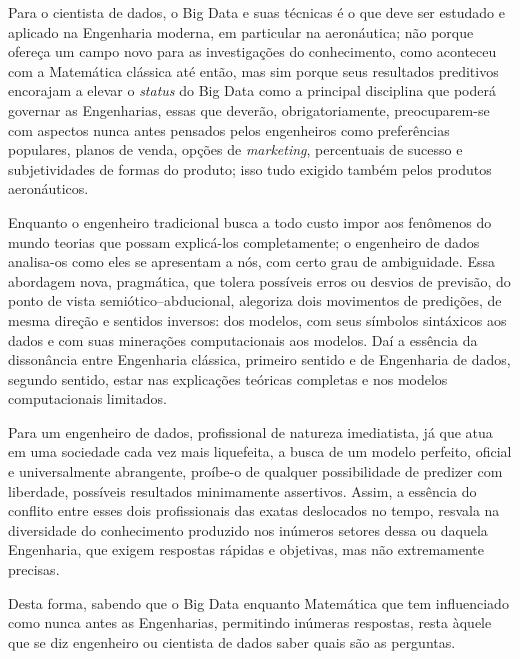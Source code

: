 \documentclass[12pt]{article} %
\begin{document}
			Para o cientista de dados, o Big Data e suas técnicas é o que deve ser estudado e aplicado na Engenharia moderna, em particular na aeronáutica; não porque ofereça um campo novo para as investigações do conhecimento, como aconteceu com a Matemática clássica até então, mas sim porque seus resultados preditivos encorajam a elevar o \textit{status} do Big Data como a principal disciplina que poderá governar as Engenharias, essas que deverão, obrigatoriamente, preocuparem-se com aspectos nunca antes pensados pelos engenheiros como preferências populares, planos de venda, opções de \textit{marketing}, percentuais de sucesso e subjetividades de formas do produto; isso tudo exigido também pelos produtos aeronáuticos.  
			
			
			Enquanto o engenheiro tradicional busca a todo custo impor aos fenômenos do mundo teorias que possam explicá-los completamente; o engenheiro de dados analisa-os como eles se apresentam a nós, com certo grau de ambiguidade. Essa abordagem nova, pragmática, que tolera possíveis erros ou desvios de previsão, do ponto de vista semiótico–abducional, alegoriza dois movimentos de predições, de mesma direção e sentidos inversos: dos modelos, com seus símbolos sintáxicos aos dados e com suas minerações computacionais aos modelos. Daí a essência da dissonância entre Engenharia clássica, primeiro sentido e de Engenharia de dados, segundo sentido, estar nas explicações teóricas completas e nos modelos computacionais limitados. 
			
			Para um engenheiro de dados, profissional de natureza imediatista, já que atua em uma sociedade cada vez mais liquefeita, a busca de um modelo perfeito, oficial e universalmente abrangente, proíbe-o de qualquer possibilidade de predizer com liberdade, possíveis resultados minimamente assertivos. Assim, a essência do conflito entre esses dois profissionais das exatas deslocados no tempo, resvala na diversidade do conhecimento produzido nos inúmeros setores dessa ou daquela Engenharia, que exigem respostas rápidas e objetivas, mas não extremamente precisas. 
			
			Desta forma, sabendo que o Big Data enquanto Matemática que tem influenciado como nunca antes as Engenharias, permitindo inúmeras respostas, resta àquele que se diz engenheiro ou cientista de dados saber quais são as perguntas. 
			
\end{document}
